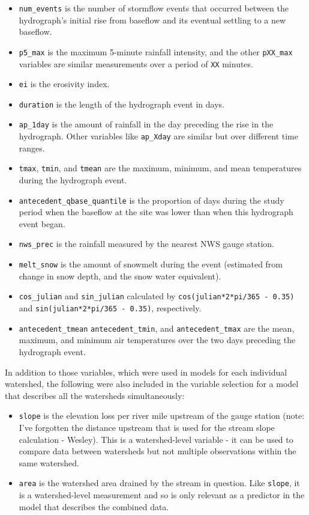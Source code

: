 \documentclass[10pt]{article}
\begin{document}
\begin{itemize}
    \item\verb!num_events! is the number of stormflow events that occurred between the hydrograph's initial rise from baseflow and its eventual settling to a new baseflow.
    \item \verb!p5_max! is the maximum 5-minute rainfall intensity, and the other \verb!pXX_max! variables are similar measurements over a period of \verb!XX! minutes.
    \item \verb!ei! is the erosivity index.
    \item \verb!duration! is the length of the hydrograph event in days.
    \item \verb!ap_1day! is the amount of rainfall in the day preceding the rise in the hydrograph. Other variables like \verb!ap_Xday! are similar but over different time   ranges.\\
    \item \verb!tmax!, \verb!tmin!, and \verb!tmean! are the maximum, minimum, and mean temperatures during the hydrograph event.
    \item \verb!antecedent_qbase_quantile! is the proportion of days during the study period when the baseflow at the site was lower than when this hydrograph event began.
    \item \verb!nws_prec! is the rainfall measured by the nearest NWS gauge station.
    \item \verb!melt_snow! is the amount of snowmelt during the event (estimated from change in snow depth, and the snow water equivalent).
    \item \verb!cos_julian! and \verb!sin_julian! calculated by \verb!cos(julian*2*pi/365 - 0.35)! and \verb!sin(julian*2*pi/365 - 0.35)!, respectively.
    \item \verb!antecedent_tmean! \verb!antecedent_tmin!, and \verb!antecedent_tmax! are the mean, maximum, and minimum air temperatures over the two days preceding the hydrograph event.
\end{itemize}

In addition to those variables, which were used in models for each individual watershed, the following were also included in the variable selection for a model that describes all the watersheds simultaneously:\\

\begin{itemize}
    \item \verb!slope! is the elevation loss per river mile upstream of the gauge station (note: I've forgotten the distance upstream that is used for the stream slope calculation - Wesley). This is a watershed-level variable - it can be used to compare data between watersheds but not multiple observations within the same watershed.
    \item \verb!area! is the watershed area drained by the stream in question. Like \verb!slope!, it is a watershed-level measurement and so is only relevant as a predictor in the model that describes the combined data.
\end{itemize}
\end{document}
